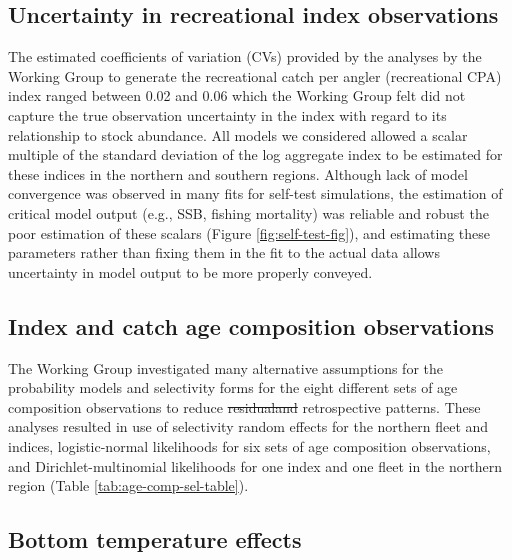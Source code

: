 \documentclass[
]{article}
\makeatletter
\providecommand{\DIFaddtex}[1]{{\protect\color{blue}\uwave{#1}}} %
\providecommand{\DIFdeltex}[1]{{\protect\color{red}\sout{#1}}} %
\providecommand{\DIFaddbegin}{} %
\providecommand{\DIFaddend}{} %
\providecommand{\DIFdelbegin}{} %
\providecommand{\DIFdelend}{} %
\providecommand{\DIFadd}[1]{\texorpdfstring{\DIFaddtex{#1}}{#1}} %
\providecommand{\DIFdel}[1]{\texorpdfstring{\DIFdeltex{#1}}{}} %
\newcommand{\DIFscaledelfig}{0.5}
\newlength{\DIFdelgraphicswidth} %
\newlength{\DIFdelgraphicsheight} %
\newcommand{\DIFaddincludegraphics}[2][]{{\color{blue}\fbox{\DIFOincludegraphics[#1]{#2}}}} %
\newcommand{\DIFdelincludegraphics}[2][]{%
\sbox{\DIFdelgraphicsbox}{\DIFOincludegraphics[#1]{#2}}%
\settoboxwidth{\DIFdelgraphicswidth}{\DIFdelgraphicsbox} %
\settoboxtotalheight{\DIFdelgraphicsheight}{\DIFdelgraphicsbox} %
\scalebox{\DIFscaledelfig}{%
\parbox[b]{\DIFdelgraphicswidth}{\usebox{\DIFdelgraphicsbox}\\[-\baselineskip] \rule{\DIFdelgraphicswidth}{0em}}\llap{\resizebox{\DIFdelgraphicswidth}{\DIFdelgraphicsheight}{%
\setlength{\unitlength}{\DIFdelgraphicswidth}%
\begin{picture}(1,1)%
\thicklines\linethickness{2pt} %
{\color[rgb]{1,0,0}\put(0,0){\framebox(1,1){}}}%
{\color[rgb]{1,0,0}\put(0,0){\line( 1,1){1}}}%
{\color[rgb]{1,0,0}\put(0,1){\line(1,-1){1}}}%
\end{picture}%
}\hspace*{3pt}}} %
} %
\DeclareRobustCommand{\DIFaddbegin}{\DIFOaddbegin \let\includegraphics\DIFaddincludegraphics} %
\DeclareRobustCommand{\DIFaddend}{\DIFOaddend \let\includegraphics\DIFOincludegraphics} %
\DeclareRobustCommand{\DIFdelbegin}{\DIFOdelbegin \let\includegraphics\DIFdelincludegraphics} %
\DeclareRobustCommand{\DIFdelend}{\DIFOaddend \let\includegraphics\DIFOincludegraphics} %
\let\sout@orig\sout %
\renewcommand{\sout}[1]{\ifmmode\text{\sout@orig{\ensuremath{#1}}}\else\sout@orig{#1}\fi} %
\makeatother
\begin{document}
\hypertarget{uncertainty-in-recreational-index-observations}{%
\subsection*{Uncertainty in recreational index observations}\label{uncertainty-in-recreational-index-observations}}

The estimated coefficients of variation (CVs) provided by the analyses by the Working Group to generate the recreational catch per angler (recreational CPA) index ranged between 0.02 and 0.06 which the Working Group felt did not capture the true observation uncertainty in the index with regard to its relationship to stock abundance. All models we considered allowed a scalar multiple of the standard deviation of the log aggregate index to be estimated for these indices in the northern and southern regions. Although lack of model convergence was observed in many fits for self-test simulations, the estimation of critical model output (e.g., SSB, fishing mortality) was reliable and robust \DIFaddbegin \DIFadd{to }\DIFaddend the poor estimation of these scalars (Figure \ref{fig:self-test-fig}), and estimating these parameters rather than fixing them in the fit to the actual data allows uncertainty in model output to be more properly conveyed.

\hypertarget{index-and-catch-age-composition-observations}{%
\subsection*{Index and catch age composition observations}\label{index-and-catch-age-composition-observations}}

The Working Group investigated many alternative assumptions for the probability models and selectivity forms for the eight different sets of age composition observations to reduce \DIFdelbegin \DIFdel{residualand }\DIFdelend \DIFaddbegin \DIFadd{residual and }\DIFaddend retrospective patterns. These analyses resulted in use of selectivity random effects for the northern fleet and indices, logistic-normal likelihoods for six sets of age composition observations, and Dirichlet-multinomial likelihoods for one index and one fleet in the northern region (Table \ref{tab:age-comp-sel-table}).

\hypertarget{bottom-temperature-effects}{%
\subsection*{Bottom temperature effects}\label{bottom-temperature-effects}}
\end{document}

